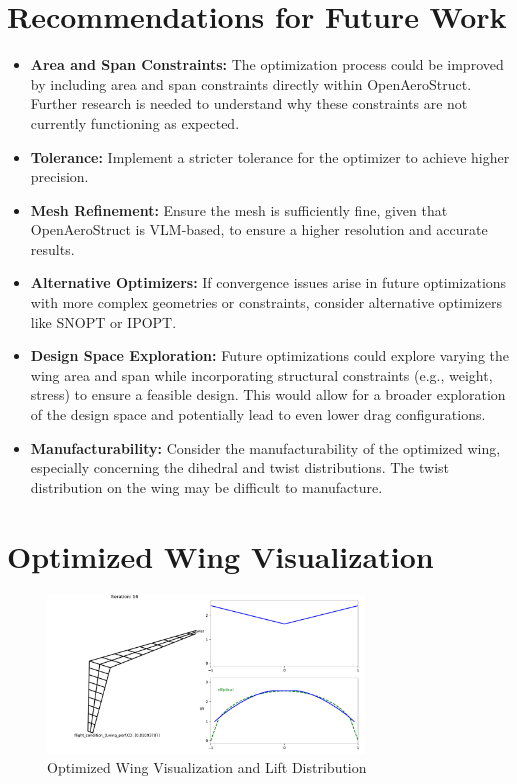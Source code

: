 \documentclass{article}
\begin{document}
\section{Recommendations for Future Work}
\begin{itemize}
    \item \textbf{Area and Span Constraints:} The optimization process could be improved by including area and span constraints directly within OpenAeroStruct. Further research is needed to understand why these constraints are not currently functioning as expected.
    \item \textbf{Tolerance:} Implement a stricter tolerance for the optimizer to achieve higher precision.
    \item \textbf{Mesh Refinement:} Ensure the mesh is sufficiently fine, given that OpenAeroStruct is VLM-based, to ensure a higher resolution and accurate results.
    \item \textbf{Alternative Optimizers:} If convergence issues arise in future optimizations with more complex geometries or constraints, consider alternative optimizers like SNOPT or IPOPT.
    \item \textbf{Design Space Exploration:} Future optimizations could explore varying the wing area and span while incorporating structural constraints (e.g., weight, stress) to ensure a feasible design. This would allow for a broader exploration of the design space and potentially lead to even lower drag configurations.
    \item \textbf{Manufacturability:} Consider the manufacturability of the optimized wing, especially concerning the dihedral and twist distributions. The twist distribution on the wing may be difficult to manufacture.
\end{itemize}

\section{Optimized Wing Visualization}
\begin{figure}[h!]
    \centering
    \includegraphics[width=0.75\textwidth]{Optimized_Wing.pdf}
    \caption{Optimized Wing Visualization and Lift Distribution}
    \label{fig:optimized_wing}
\end{figure}
\end{document}
